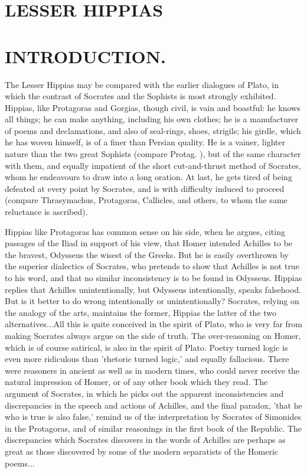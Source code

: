 \documentclass[11pt,letter]{article}
\begin{document}
\par 
\section{
      LESSER HIPPIAS
    }
\par 
\section{
      INTRODUCTION.
    }
\par  The Lesser Hippias may be compared with the earlier dialogues of Plato, in which the contrast of Socrates and the Sophists is most strongly exhibited. Hippias, like Protagoras and Gorgias, though civil, is vain and boastful: he knows all things; he can make anything, including his own clothes; he is a manufacturer of poems and declamations, and also of seal-rings, shoes, strigils; his girdle, which he has woven himself, is of a finer than Persian quality. He is a vainer, lighter nature than the two great Sophists (compare Protag. ), but of the same character with them, and equally impatient of the short cut-and-thrust method of Socrates, whom he endeavours to draw into a long oration. At last, he gets tired of being defeated at every point by Socrates, and is with difficulty induced to proceed (compare Thrasymachus, Protagoras, Callicles, and others, to whom the same reluctance is ascribed).

\par  Hippias like Protagoras has common sense on his side, when he argues, citing passages of the Iliad in support of his view, that Homer intended Achilles to be the bravest, Odysseus the wisest of the Greeks. But he is easily overthrown by the superior dialectics of Socrates, who pretends to show that Achilles is not true to his word, and that no similar inconsistency is to be found in Odysseus. Hippias replies that Achilles unintentionally, but Odysseus intentionally, speaks falsehood. But is it better to do wrong intentionally or unintentionally? Socrates, relying on the analogy of the arts, maintains the former, Hippias the latter of the two alternatives...All this is quite conceived in the spirit of Plato, who is very far from making Socrates always argue on the side of truth. The over-reasoning on Homer, which is of course satirical, is also in the spirit of Plato. Poetry turned logic is even more ridiculous than 'rhetoric turned logic,' and equally fallacious. There were reasoners in ancient as well as in modern times, who could never receive the natural impression of Homer, or of any other book which they read. The argument of Socrates, in which he picks out the apparent inconsistencies and discrepancies in the speech and actions of Achilles, and the final paradox, 'that he who is true is also false,' remind us of the interpretation by Socrates of Simonides in the Protagoras, and of similar reasonings in the first book of the Republic. The discrepancies which Socrates discovers in the words of Achilles are perhaps as great as those discovered by some of the modern separatists of the Homeric poems...
\end{document}
